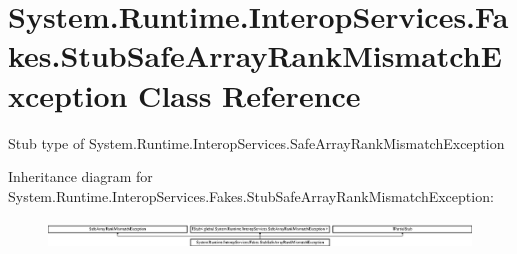 \hypertarget{class_system_1_1_runtime_1_1_interop_services_1_1_fakes_1_1_stub_safe_array_rank_mismatch_exception}{\section{System.\-Runtime.\-Interop\-Services.\-Fakes.\-Stub\-Safe\-Array\-Rank\-Mismatch\-Exception Class Reference}
\label{class_system_1_1_runtime_1_1_interop_services_1_1_fakes_1_1_stub_safe_array_rank_mismatch_exception}
}


Stub type of System.\-Runtime.\-Interop\-Services.\-Safe\-Array\-Rank\-Mismatch\-Exception 


Inheritance diagram for System.\-Runtime.\-Interop\-Services.\-Fakes.\-Stub\-Safe\-Array\-Rank\-Mismatch\-Exception\-:\begin{figure}[H]
\begin{center}
\leavevmode
\includegraphics[height=0.761905cm]{class_system_1_1_runtime_1_1_interop_services_1_1_fakes_1_1_stub_safe_array_rank_mismatch_exception}
\end{center}
\end{figure}
